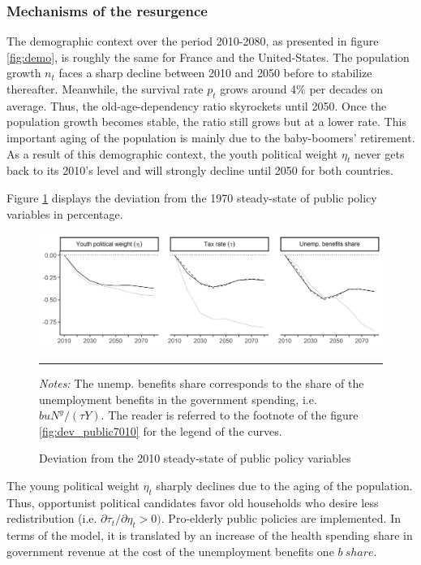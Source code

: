 \subsubsection{Mechanisms of the resurgence}

The demographic context over the period 2010-2080, as presented in figure \ref{fig:demo}, is roughly the same for France and the United-States. The population growth $n_t$ faces a sharp decline between 2010 and 2050 before to stabilize thereafter. Meanwhile, the survival rate $p_t$ grows around 4\% per decades on average. Thus, the old-age-dependency ratio skyrockets until 2050. Once the population growth becomes stable, the ratio still grows but at a lower rate. This important aging of the population is mainly due to the baby-boomers' retirement. As a result of this demographic context, the youth political weight $\eta_t$ never gets back to its 2010's level and will strongly decline until 2050 for both countries.


Figure \ref{fig:dev_public1080} displays the deviation from the 1970 steady-state of public policy variables in percentage.
\begin{figure}[tb]
	\centering
	\includegraphics[width=1\linewidth]{../result/deviation/dev_public1080.png}
	\caption{Deviation from the 2010 steady-state of public policy variables}
	\label{fig:dev_public1080}
	\vspace{.5ex}
	\hrule
	\vspace{-4ex}
	\justify\singlespacing\footnotesize \textit{Notes:} The unemp. benefits share corresponds to the share of the unemployment benefits in the government spending, i.e. $buN^y/(\tau Y)$. The reader is referred to the footnote of the figure \ref{fig:dev_public7010} for the legend of the curves.
\end{figure}
The young political weight $\eta_t$ sharply declines due to the aging of the population. Thus, opportunist political candidates favor old households who desire less redistribution (i.e. $\partial\tau_t / \partial \eta_t > 0)$. Pro-elderly public policies are implemented. In terms of the model, it is translated by an increase of the health spending share in government revenue at the cost of the unemployment benefits one $b~share$.

